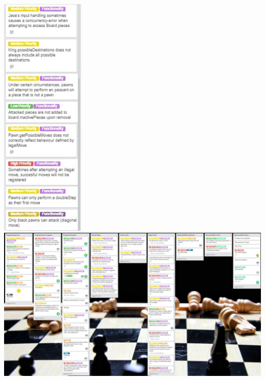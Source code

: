 \documentclass{article}
\begin{document}
\includegraphics[width=4cm]{20180503-bugxfixed3.jpg} \\
\includegraphics[width=16cm]{20180508-hele.jpg} \\
\end{document}
